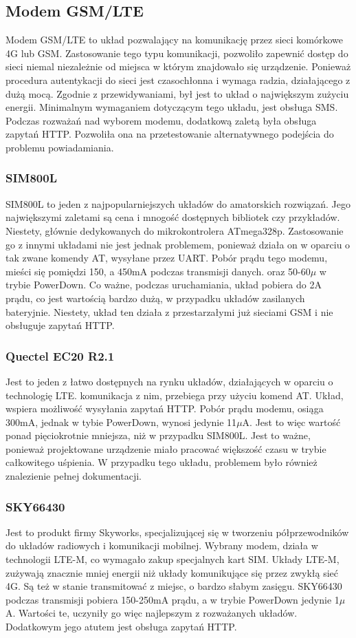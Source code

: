 \subsection{Modem GSM/LTE}
Modem GSM/LTE to układ pozwalający na komunikację przez sieci komórkowe 4G lub GSM. Zastosowanie tego typu komunikacji, pozwoliło zapewnić dostęp do sieci niemal niezależnie od miejsca w którym znajdowało się urządzenie. Ponieważ procedura autentykacji do sieci jest czasochłonna i wymaga radzia, działającego z dużą mocą. Zgodnie z przewidywaniami, był jest to układ o największym zużyciu energii. Minimalnym wymaganiem dotyczącym tego układu, jest obsługa SMS. Podczas rozważań nad wyborem modemu, dodatkową zaletą była obsługa zapytań HTTP. Pozwoliła ona na przetestowanie alternatywnego podejścia do problemu powiadamiania.

\subsubsection{SIM800L}
SIM800L to jeden z najpopularniejszych układów do amatorskich rozwiązań. Jego największymi zaletami są cena i mnogość dostępnych bibliotek czy przykładów. Niestety, głównie dedykowanych do mikrokontrolera ATmega328p. Zastosowanie go z innymi układami nie jest jednak problemem, ponieważ działa on w oparciu o tak zwane komendy AT, wysyłane przez UART. Pobór prądu tego modemu, mieści się pomiędzi 150, a 450mA podczas transmisji danych. oraz 50-60$\mu$ w trybie PowerDown. Co ważne, podczas uruchamiania, układ pobiera do 2A prądu, co jest wartością bardzo dużą, w przypadku układów zasilanych bateryjnie. Niestety, układ ten działa z przestarzałymi już sieciami GSM i nie obsługuje zapytań HTTP.\cite{SIM800L}

\subsubsection{Quectel EC20 R2.1}
Jest to jeden z łatwo dostępnych na rynku układów, działających w oparciu o technologię LTE. komunikacja z nim, przebiega przy użyciu komend AT. Układ, wspiera możliwość wysyłania zapytań HTTP. Pobór prądu modemu, osiąga 300mA, jednak w tybie PowerDown, wynosi jedynie 11$\mu$A. Jest to więc wartość ponad pięciokrotnie mniejsza, niż w przypadku SIM800L. Jest to ważne, ponieważ projektowane urządzenie miało pracować większość czasu w trybie całkowitego uśpienia. W przypadku tego układu, problemem było również znalezienie pełnej dokumentacji.

\subsubsection{SKY66430}
Jest to produkt firmy Skyworks, specjalizującej się w tworzeniu półprzewodników do układów radiowych i komunikacji mobilnej. Wybrany modem, działa w technologii LTE-M, co wymagało zakup specjalnych kart SIM. Układy LTE-M, zużywają znacznie mniej energii niż układy komunikujące się przez zwykłą sieć 4G. Są też w stanie transmitować z miejsc, o bardzo słabym zasięgu. SKY66430 podczas transmisji pobiera 150-250mA prądu, a w trybie PowerDown jedynie 1$\mu$A. Wartości te, uczyniły go więc najlepszym z rozważanych układów. Dodatkowym jego atutem jest obsługa zapytań HTTP. \cite{SKY66430}

